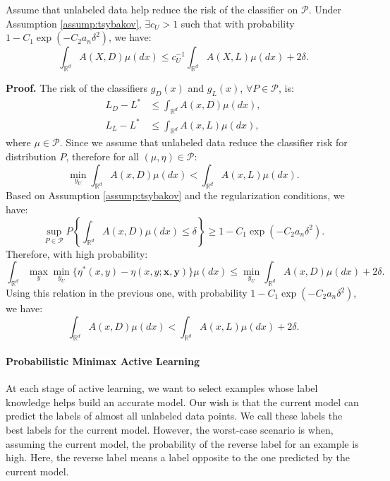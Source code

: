 	\begin{lemma}
		Assume that unlabeled data help reduce the risk of the classifier on $\mathcal{P}$. Under Assumption \ref{assump:tsybakov}, $\exists c_U > 1$ such that with probability $1 - C_1 \exp(-C_2 a_n \delta^2)$, we have:
		\begin{equation}
			\int_{\mathbb{R}^d} A(X, D) \mu(dx) \le c_U^{-1} \int_{\mathbb{R}^d} A(X, L) \mu(dx) + 2\delta.
		\end{equation}
	\end{lemma}
	
	\textbf{Proof.} The risk of the classifiers $g_D(x)$ and $g_L(x)$, $\forall P \in \mathcal{P}$, is:
	\begin{align}
		L_D - L^* &\le \int_{\mathbb{R}^d} A(x, D) \mu(dx), \\
		L_L - L^* &\le \int_{\mathbb{R}^d} A(x, L) \mu(dx),
	\end{align}
	where $\mu \in \mathcal{P}$. Since we assume that unlabeled data reduce the classifier risk for distribution $P$, therefore for all $(\mu, \eta) \in \mathcal{P}$:
	\begin{equation}
		\min_{y_U} \int_{\mathbb{R}^d} A(x, D) \mu(dx) < \int_{\mathbb{R}^d} A(x, L) \mu(dx).
	\end{equation}
	Based on Assumption \ref{assump:tsybakov} and the regularization conditions, we have:
	\begin{equation}
		\sup_{P \in \mathcal{P}} P\left\{ \int_{\mathbb{R}^d} A(x, D) \mu(dx) \le \delta \right\} \ge 1 - C_1 \exp(-C_2 a_n \delta^2).
	\end{equation}
	Therefore, with high probability:
	\begin{equation}
		\int_{\mathbb{R}^d} \max_y \min_{y_U} \{\eta^*(x, y) - \eta(x, y; \mathbf{x}, \mathbf{y})\} \mu(dx) \le \min_{y_U} \int_{\mathbb{R}^d} A(x, D) \mu(dx) + 2\delta.
	\end{equation}
	Using this relation in the previous one, with probability $1 - C_1 \exp(-C_2 a_n \delta^2)$, we have:
	\begin{equation}
		\int_{\mathbb{R}^d} A(x, D) \mu(dx) < \int_{\mathbb{R}^d} A(x, L) \mu(dx) + 2\delta.
	\end{equation}
	
	\paragraph{Probabilistic Minimax Active Learning}
	At each stage of active learning, we want to select examples whose label knowledge helps build an accurate model. Our wish is that the current model can predict the labels of almost all unlabeled data points. We call these labels the best labels for the current model. However, the worst-case scenario is when, assuming the current model, the probability of the reverse label for an example is high. Here, the reverse label means a label opposite to the one predicted by the current model.
	
